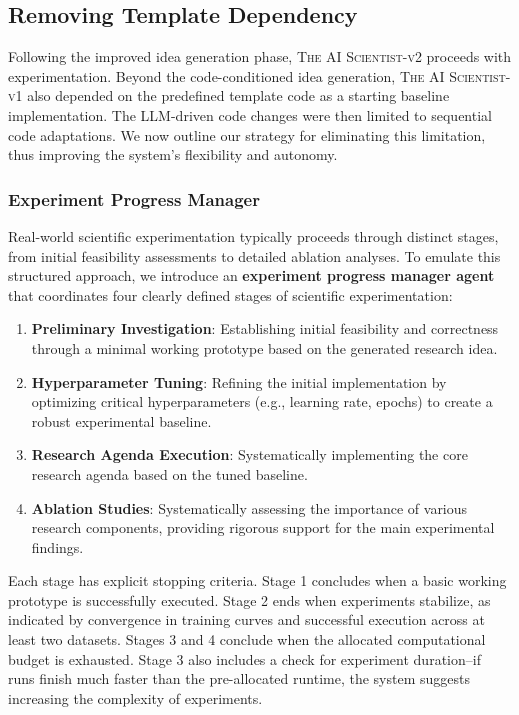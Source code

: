 \documentclass[11pt, a4paper]{include/gdm_format}
\newcommand{\oldalgo}{\textsc{The AI Scientist-v1}\xspace}
\newcommand{\ouralgo}{\textsc{The AI Scientist-v2}\xspace}
\begin{document}
\subsection{Removing Template Dependency}
\label{sec:removing_template_dependency}
Following the improved idea generation phase, \ouralgo proceeds with experimentation. Beyond the code-conditioned idea generation, \oldalgo also depended on the predefined template code as a starting baseline implementation. The LLM-driven code changes were then limited to sequential code adaptations. We now outline our strategy for eliminating this limitation, thus improving the system's flexibility and autonomy.

\subsubsection{Experiment Progress Manager}
\label{exp_progress_manager}

Real-world scientific experimentation typically proceeds through distinct stages, from initial feasibility assessments to detailed ablation analyses. To emulate this structured approach, we introduce an \textbf{experiment progress manager agent} that coordinates four clearly defined stages of scientific experimentation:

\begin{enumerate}[label=\textbf{Stage \arabic*}, leftmargin=*]
\item \textbf{Preliminary Investigation}: Establishing initial feasibility and correctness through a minimal working prototype based on the generated research idea.
\item \textbf{Hyperparameter Tuning}: Refining the initial implementation by optimizing critical hyperparameters (e.g., learning rate, epochs) to create a robust experimental baseline.
\item \textbf{Research Agenda Execution}: Systematically implementing the core research agenda based on the tuned baseline.
\item \textbf{Ablation Studies}: Systematically assessing the importance of various research components, providing rigorous support for the main experimental findings.
\end{enumerate}

Each stage has explicit stopping criteria. Stage 1 concludes when a basic working prototype is successfully executed. Stage 2 ends when experiments stabilize, as indicated by convergence in training curves and successful execution across at least two datasets. Stages 3 and 4 conclude when the allocated computational budget is exhausted.
Stage 3 also includes a check for experiment duration--if runs finish much faster than the pre-allocated runtime, the system suggests increasing the complexity of experiments.
\end{document}
